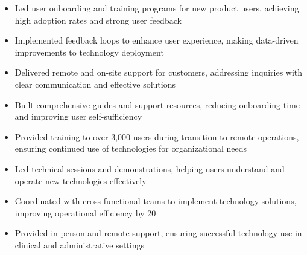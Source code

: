 \par\smallskip
\noindent
\begin{minipage}{20cm}
  \begin{minipage}{9.75cm}
    \begin{itemize}
      \item Led user onboarding and training programs for new product users, achieving high adoption rates and strong user feedback
      \item Implemented feedback loops to enhance user experience, making data-driven improvements to technology deployment
    \end{itemize}
  \end{minipage}
  \hfill
  \begin{minipage}{9.75cm}
    \begin{itemize}
      \item Delivered remote and on-site support for customers, addressing inquiries with clear communication and effective solutions
      \item Built comprehensive guides and support resources, reducing onboarding time and improving user self-sufficiency
    \end{itemize}
  \end{minipage}
\end{minipage}
\par\smallskip
\divider

\par\smallskip
\noindent
\begin{minipage}{20cm}
  \begin{minipage}{9.75cm}
    \begin{itemize}
      \item Provided training to over 3,000 users during transition to remote operations, ensuring continued use of technologies for organizational needs
      \item Led technical sessions and demonstrations, helping users understand and operate new technologies effectively
    \end{itemize}
  \end{minipage}
  \hfill
  \begin{minipage}{9.75cm}
    \begin{itemize}
      \item Coordinated with cross-functional teams to implement technology solutions, improving operational efficiency by 20%
      \item Provided in-person and remote support, ensuring successful technology use in clinical and administrative settings
    \end{itemize}
  \end{minipage}
\end{minipage}

